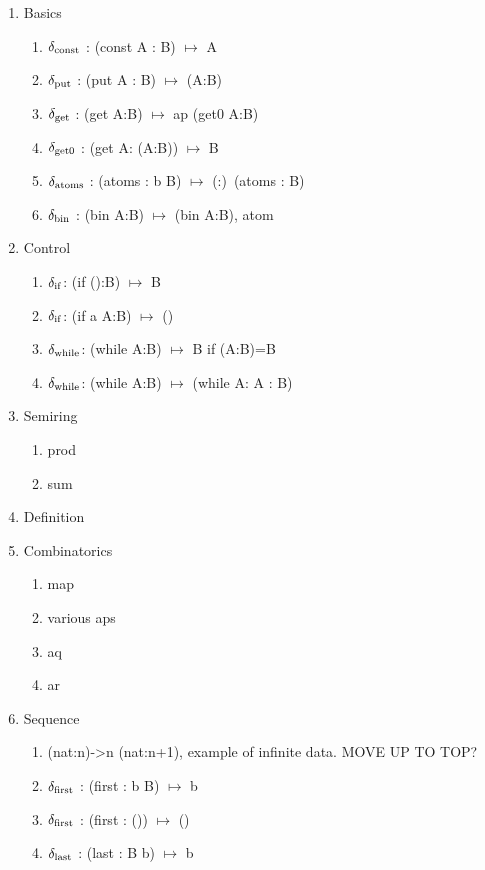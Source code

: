 \documentclass[11pt]{article}
\begin{document}
\begin{enumerate}
\item {Basics
\begin{enumerate}
\item{$\delta_{\rm const}$ : (const A : B) $\mapsto$ A}
\item{$\delta_{\rm put}$ : (put A : B) $\mapsto$ (A:B)}
\item{$\delta_{\rm get}$ : (get A:B) $\mapsto$ ap (get0 A:B)}  
\item{$\delta_{\rm get0}$ : (get A: (A:B)) $\mapsto$ B}
\item{$\delta_{\rm atoms}$ : (atoms : b B) $\mapsto$ (:)\ (atoms : B)}
\item{$\delta_{\rm bin}$ : (bin A:B) $\mapsto$ (bin A:B), atom} 
\end{enumerate}
}
\item {Control
\begin{enumerate}
\item{$\delta_{\rm if}$: (if ():B) $\mapsto$ B }
\item{$\delta_{\rm if}$: (if a A:B) $\mapsto$ () }
\item{$\delta_{\rm while}$: (while A:B) $\mapsto$ B if (A:B)=B }
\item{$\delta_{\rm while}$: (while A:B) $\mapsto$ (while A: A : B) }
\end{enumerate}
}
\item{Semiring
\begin{enumerate}
\item{prod}
\item{sum}
\end{enumerate}
}
\item{Definition}
\item{Combinatorics} 
\begin{enumerate}
\item{map}
\item{various aps}
\item{aq}
\item{ar}
\end{enumerate}
\item{Sequence 
\begin{enumerate}
\item{(nat:n)->n (nat:n+1), example of infinite data.  MOVE UP TO TOP?}
\item{$\delta_{\rm first}$ : (first : b B) $\mapsto$ b}
\item{$\delta_{\rm first}$ : (first : ()) $\mapsto$ ()} 
\item{$\delta_{\rm last}$ : (last : B b) $\mapsto$ b} 

\end{enumerate}}
\end{enumerate}
\end{document}
